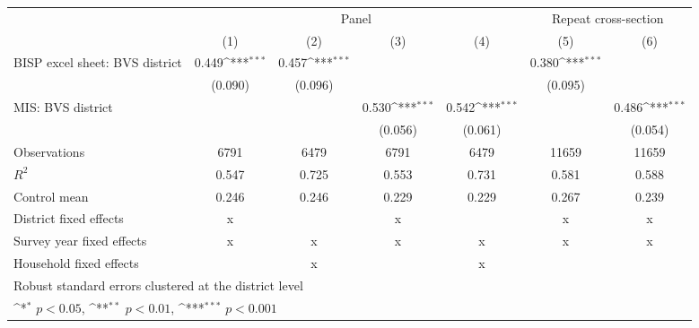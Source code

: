 {
\def\sym#1{\ifmmode^{#1}\else\(^{#1}\)\fi}
\begin{tabular}{l*{6}{c}}
\hline\hline
                    &\multicolumn{4}{c}{Panel}                                                              &\multicolumn{2}{c}{Repeat cross-section}   \\\cmidrule(lr){2-5}\cmidrule(lr){6-7}
                    &\multicolumn{1}{c}{(1)}         &\multicolumn{1}{c}{(2)}         &\multicolumn{1}{c}{(3)}         &\multicolumn{1}{c}{(4)}         &\multicolumn{1}{c}{(5)}         &\multicolumn{1}{c}{(6)}         \\
\hline
BISP excel sheet: BVS district&       0.449\sym{***}&       0.457\sym{***}&                     &                     &       0.380\sym{***}&                     \\
                    &     (0.090)         &     (0.096)         &                     &                     &     (0.095)         &                     \\
[1em]
MIS: BVS district   &                     &                     &       0.530\sym{***}&       0.542\sym{***}&                     &       0.486\sym{***}\\
                    &                     &                     &     (0.056)         &     (0.061)         &                     &     (0.054)         \\
\hline
Observations        &        6791         &        6479         &        6791         &        6479         &       11659         &       11659         \\
\(R^{2}\)           &       0.547         &       0.725         &       0.553         &       0.731         &       0.581         &       0.588         \\
Control mean        &       0.246         &       0.246         &       0.229         &       0.229         &       0.267         &       0.239         \\
District fixed effects&           x         &                     &           x         &                     &           x         &           x         \\
Survey year fixed effects&           x         &           x         &           x         &           x         &           x         &           x         \\
Household fixed effects&                     &           x         &                     &           x         &                     &                     \\
\hline\hline
\multicolumn{7}{l}{\footnotesize Robust standard errors clustered at the district level}\\
\multicolumn{7}{l}{\footnotesize \sym{*} \(p<0.05\), \sym{**} \(p<0.01\), \sym{***} \(p<0.001\)}\\
\end{tabular}
}
